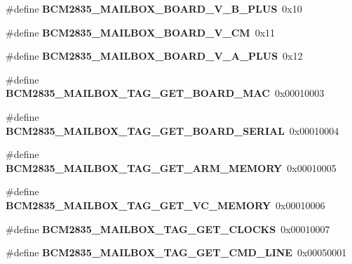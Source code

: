 \begin{DoxyCompactItemize}
\#define {\bfseries B\+C\+M2835\+\_\+\+M\+A\+I\+L\+B\+O\+X\+\_\+\+B\+O\+A\+R\+D\+\_\+\+V\+\_\+\+B\+\_\+\+P\+L\+US}~0x10
\item 
\mbox{\label{group__raspberrypi__vc_gaf0e419446843fc288b5b6046604b0e46}} 
\#define {\bfseries B\+C\+M2835\+\_\+\+M\+A\+I\+L\+B\+O\+X\+\_\+\+B\+O\+A\+R\+D\+\_\+\+V\+\_\+\+CM}~0x11
\item 
\mbox{\label{group__raspberrypi__vc_ga54d319a41f6b25c46dddbb954e26d105}} 
\#define {\bfseries B\+C\+M2835\+\_\+\+M\+A\+I\+L\+B\+O\+X\+\_\+\+B\+O\+A\+R\+D\+\_\+\+V\+\_\+\+A\+\_\+\+P\+L\+US}~0x12
\item 
\mbox{\label{group__raspberrypi__vc_gaebdb54c98a4fed6aaa5420cbf99b5f9c}} 
\#define {\bfseries B\+C\+M2835\+\_\+\+M\+A\+I\+L\+B\+O\+X\+\_\+\+T\+A\+G\+\_\+\+G\+E\+T\+\_\+\+B\+O\+A\+R\+D\+\_\+\+M\+AC}~0x00010003
\item 
\mbox{\label{group__raspberrypi__vc_ga1a244b5e81ebb12d87a64cc48af6d51d}} 
\#define {\bfseries B\+C\+M2835\+\_\+\+M\+A\+I\+L\+B\+O\+X\+\_\+\+T\+A\+G\+\_\+\+G\+E\+T\+\_\+\+B\+O\+A\+R\+D\+\_\+\+S\+E\+R\+I\+AL}~0x00010004
\item 
\mbox{\label{group__raspberrypi__vc_ga4ea87bb467e4b8d3f41ac16844313be7}} 
\#define {\bfseries B\+C\+M2835\+\_\+\+M\+A\+I\+L\+B\+O\+X\+\_\+\+T\+A\+G\+\_\+\+G\+E\+T\+\_\+\+A\+R\+M\+\_\+\+M\+E\+M\+O\+RY}~0x00010005
\item 
\mbox{\label{group__raspberrypi__vc_gaa86aa0d367e8dd4156b09116d7595b72}} 
\#define {\bfseries B\+C\+M2835\+\_\+\+M\+A\+I\+L\+B\+O\+X\+\_\+\+T\+A\+G\+\_\+\+G\+E\+T\+\_\+\+V\+C\+\_\+\+M\+E\+M\+O\+RY}~0x00010006
\item 
\mbox{\label{group__raspberrypi__vc_ga7c1d8311289342d650d430b491b407b1}} 
\#define {\bfseries B\+C\+M2835\+\_\+\+M\+A\+I\+L\+B\+O\+X\+\_\+\+T\+A\+G\+\_\+\+G\+E\+T\+\_\+\+C\+L\+O\+C\+KS}~0x00010007
\item 
\mbox{\label{group__raspberrypi__vc_ga0f9ea284c3f3ffe7b47aa20875996838}} 
\#define {\bfseries B\+C\+M2835\+\_\+\+M\+A\+I\+L\+B\+O\+X\+\_\+\+T\+A\+G\+\_\+\+G\+E\+T\+\_\+\+C\+M\+D\+\_\+\+L\+I\+NE}~0x00050001

\end{DoxyCompactItemize}
